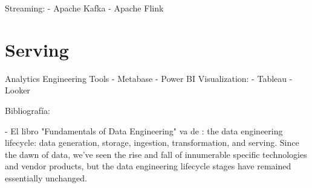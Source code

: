 \documentclass[12pt]{book}
\begin{document}
Streaming:
- Apache Kafka
- Apache Flink

\section{Serving}
Analytics Engineering Tools
- Metabase
- Power BI
Visualization:
- Tableau
- Looker


Bibliografía: 

- El libro "Fundamentals of Data Engineering" va de : the data engineering lifecycle: data generation, storage, ingestion, transformation, and serving. Since the dawn of data, we've seen the rise and fall of innumerable specific technologies and vendor products, but the data engineering lifecycle stages have remained essentially unchanged. 
\end{document}
